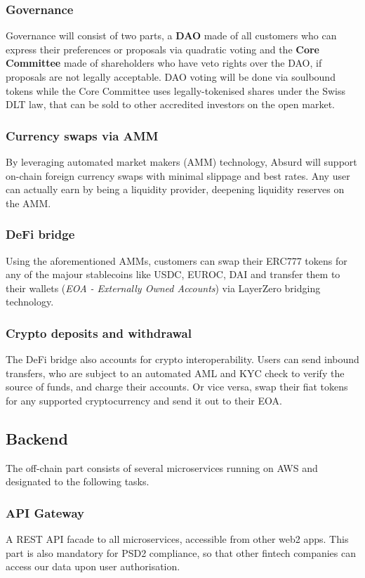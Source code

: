 \documentclass[a4paper,10 pt]{article}
\theoremstyle{definition}
\begin{document}
\subsubsection{Governance}
Governance will consist of two parts, a \textbf{DAO} made of all customers who can express their preferences or proposals via quadratic voting and the \textbf{Core Committee} made of shareholders who have veto rights over the DAO, if proposals are not legally acceptable.
DAO voting will be done via soulbound tokens while the Core Committee uses legally-tokenised shares under the Swiss DLT law, that can be sold to other accredited investors on the open market.

\subsubsection{Currency swaps via AMM}
By leveraging automated market makers (AMM) technology, Absurd will support on-chain foreign currency swaps with minimal slippage and best rates. Any user can actually earn by being a liquidity provider, deepening liquidity reserves on the AMM.

\subsubsection{DeFi bridge}\label{bridgeSub}
Using the aforementioned AMMs, customers can swap their ERC777 tokens for any of the majour stablecoins like USDC, EUROC, DAI and transfer them to their wallets (\textit{EOA - Externally Owned Accounts}) via LayerZero bridging technology.

\subsubsection{Crypto deposits and withdrawal}
The DeFi bridge also accounts for crypto interoperability. Users can send inbound transfers, who are subject to an automated AML and KYC check to verify the source of funds, and charge their accounts. Or vice versa, swap their fiat tokens for any supported cryptocurrency and send it out to their EOA.

\subsection{Backend}
The off-chain part consists of several microservices running on AWS and designated to the following tasks.

\subsubsection{API Gateway}
A REST API facade to all microservices, accessible from other web2 apps.
This part is also mandatory for PSD2 compliance, so that other fintech companies can access our data upon user authorisation.
\end{document}
